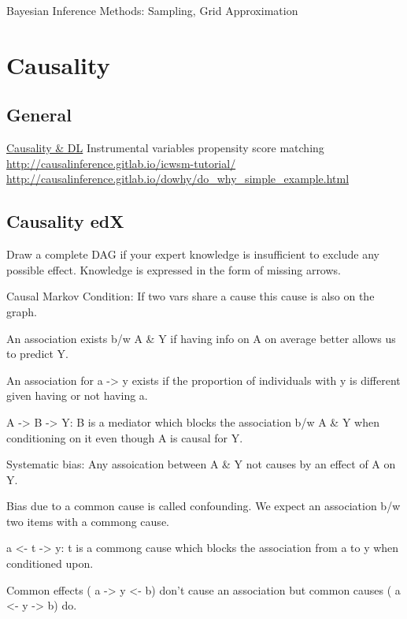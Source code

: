 \documentclass[]{book}
\begin{document}
Bayesian Inference Methods: Sampling, Grid Approximation

\hypertarget{causality}{%
\section{Causality}\label{causality}}

\hypertarget{general-7}{%
\subsection{General}\label{general-7}}

\href{https://twitter.com/tdietterich/status/1034631407904018437}{Causality \& DL} Instrumental variables propensity score matching \url{http://causalinference.gitlab.io/icwsm-tutorial/} \url{http://causalinference.gitlab.io/dowhy/do_why_simple_example.html}

\hypertarget{causality-edx}{%
\subsection{Causality edX}\label{causality-edx}}

Draw a complete DAG if your expert knowledge is insufficient to exclude any possible effect.
Knowledge is expressed in the form of missing arrows.

Causal Markov Condition: If two vars share a cause this cause is also on the graph.

An association exists b/w A \& Y if having info on A on average better allows us to predict Y.

An association for a -\textgreater{} y exists if the proportion of individuals with y is different given having or not having a.

A -\textgreater{} B -\textgreater{} Y: B is a mediator which blocks the association b/w A \& Y when conditioning on it
even though A is causal for Y.

Systematic bias: Any assoication between A \& Y not causes by an effect of A on Y.

Bias due to a common cause is called confounding. We expect an association b/w two items with a commong cause.

a \textless{}- t -\textgreater{} y: t is a commong cause which blocks the association from a to y when conditioned upon.

Common effects ( a -\textgreater{} y \textless{}- b) don't cause an association but common causes ( a \textless{}- y -\textgreater{} b) do.
\end{document}
